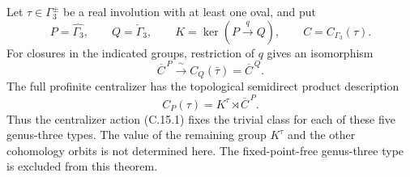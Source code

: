 \begin{theorem}
\label{C-genus-three-centralizer-reduction}
Let $\tau\in\Gamma_3^{\pm}$ be a real involution with at least
one oval, and put
\[
 P=\widehat{\Gamma_3},\qquad Q=\check\Gamma_3,
 \qquad K=\ker(P\xrightarrow{q}Q),\qquad
 C=C_{\Gamma_3}(\tau).
\]
For closures in the indicated groups, restriction of $q$ gives
an isomorphism
\[
 \overline C^{\,P}\xrightarrow{\ \sim\ }
 C_Q(\bar\tau)=\overline C^{\,Q}.
\tag{C.17.1}
\]
The full profinite centralizer has the topological semidirect
product description
\[
 C_P(\tau)=K^\tau\rtimes\overline C^{\,P}.
\tag{C.17.2}
\]
Thus the centralizer action (C.15.1) fixes the trivial class
for each of these five genus-three types. The value of the
remaining group $K^\tau$ and the other cohomology orbits is
not determined here. The fixed-point-free genus-three type
is excluded from this theorem.
\end{theorem}
